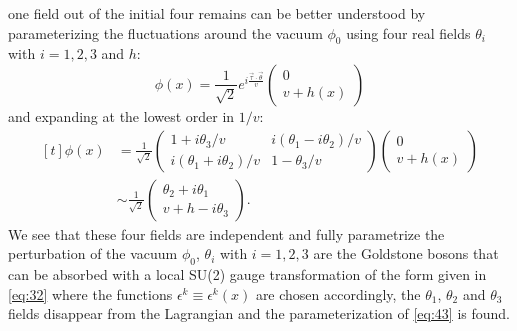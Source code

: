 one field out of the initial four remains can be better understood by
parameterizing the fluctuations around the vacuum $\phi_0$ using four real
fields $\theta_i$ with $i = 1, 2, 3$ and $h$:
\begin{equation}
  \label{eq:42}
  \phi(x) = \frac{1}{\sqrt{2}} e^{i \frac{\vec{\tau} \cdot \vec{\theta}}{v}}
  \begin{pmatrix}
    0 \\
    v + h(x)
  \end{pmatrix}
\end{equation}
and expanding at the lowest order in $1/v$:
\begin{equation}
  \label{eq:154}
  \begin{aligned}[t]
    \phi(x) & = \frac{1}{\sqrt{2}}
    \begin{pmatrix}
      1 + i \theta_3/v & i(\theta_1 - i \theta_2)/v \\
      i(\theta_1 + i \theta_2)/v &1 - \theta_3/v
    \end{pmatrix}
    \begin{pmatrix}
      0 \\
      v + h(x)
    \end{pmatrix} \\
    & \sim \frac{1}{\sqrt{2}}
    \begin{pmatrix}
      \theta_2 + i \theta_1 \\
      v + h - i \theta_3
    \end{pmatrix}.
  \end{aligned}
\end{equation}
We see that these four fields are independent and fully parametrize the
perturbation of the vacuum $\phi_0$, $\theta_i$ with $i = 1, 2, 3$ are the
Goldstone bosons that can be absorbed with a local SU(2) gauge transformation of
the form given in \cref{eq:32} where the functions
$\epsilon^k \equiv \epsilon^k(x)$ are chosen accordingly, the $\theta_1$,
$\theta_2$ and $\theta_3$ fields disappear from the Lagrangian and the
parameterization of \cref{eq:43} is found.

